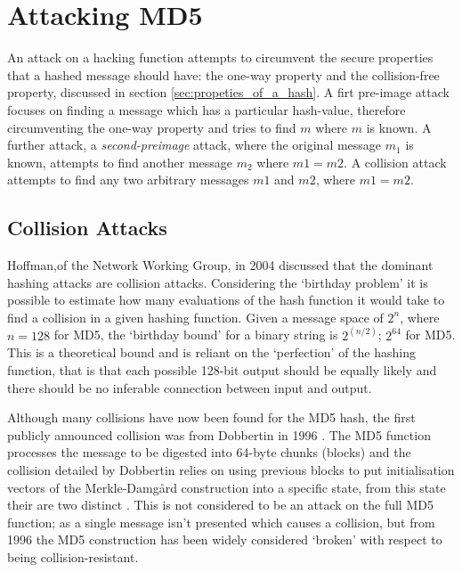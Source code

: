 \documentclass[a4paper,12pt]{article}
\newcommand{\hash}[1]{#1}
\begin{document}
\section{Attacking MD5}
An attack on a hacking function attempts to circumvent the secure properties that a hashed message should have: the one-way property and the collision-free property, discussed in section \ref{sec:propeties_of_a_hash}.
A firt pre-image attack focuses on finding a message which has a particular hash-value, therefore circumventing the one-way property and tries to find $m$ where $\hash{m}$ is known. A further attack, a \emph{second-preimage} attack, where the original message $m_1$ is known, attempts to find another message $m_2$ where $\hash{m1} = \hash{m2}$.
A collision attack attempts to find any two arbitrary messages $m1$ and $m2$, where $\hash{m1} = \hash{m2}$.

\subsection{Collision Attacks}
Hoffman,of the Network Working Group, in 2004 discussed that the dominant hashing attacks are collision attacks. Considering the `birthday problem' it is possible to estimate how many evaluations of the hash function it would take to find a collision in a given hashing function. Given a message space of  $2^n$, where $n = 128$ for MD5, the `birthday bound' for a binary string is $2^{(n/2)}$; $2^{64}$ for MD5. This is a theoretical bound and is reliant on the `perfection' of the hashing function, that is that each possible 128-bit output should be equally likely and there should be no inferable connection between input and output. 

Although many collisions have now been found for the MD5 hash, the first publicly announced collision was from Dobbertin in 1996 \cite{dobbertin}. The MD5 function processes the message to be digested into 64-byte chunks (blocks) and the collision detailed by Dobbertin relies on using previous blocks to put initialisation vectors of the Merkle-Damgård construction into a specific state, from this state their are two distinct . This is not considered to be an attack on the full MD5 function; as a single message isn’t presented which causes a collision, but from 1996 the MD5 construction has been widely considered `broken’ with respect to being collision-resistant.
\end{document}

